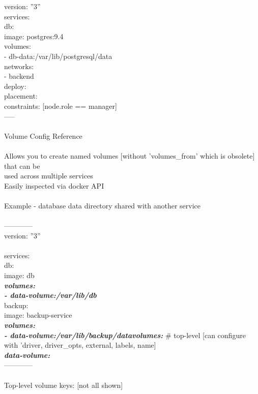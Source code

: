 \documentclass[10pt,a4paper]{article}
\begin{document}
{{{{{{{{{{version: ''3''\\
services:\\
  db:\\
    image: postgres:9.4\\
    volumes:\\
      - db-data:/var/lib/postgresql/data\\
    networks:\\
      - backend\\
    deploy:\\
      placement:\\
        constraints: [node.role == manager]\\
-----\\
\\
Volume Config Reference\\
\\
Allows you to create named volumes [without 'volumes\_from' which is obsolete]\\
that can be \\
used across multiple services}{\large    \\
Easily inspected via docker API\\
\\
Example - database data directory shared with another service\\
\\
------------\\
version: ''3''\\
\\
services:\\
  db:\\
    image: db\\
\textbf{\textit{    volumes:\\
      - data-volume:/var/lib/db}}}{\large {\large \\
  backup:\\
    image: backup-service\\
\textbf{\textit{    volumes:\\
      - data-volume:/var/lib/backup/data}}}{\large {\large \textbf{\textit{volumes: }}}{\large {\large  \# top-level    [can configure with 'driver, driver\_opts, external, labels, name]}{\large \textbf{\textit{\\
  data-volume:}}}{\large {\large \\
------------\\
\\
Top-level volume keys: [not all shown]\\
\\
}}}}}}}}}}}}}}
\end{document}
